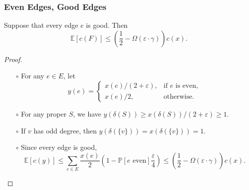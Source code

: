 \documentclass{beamer}
\newcommand{\EE}{\mathbb{E}}
\newcommand{\PP}{\mathbb{P}}
\begin{document}
  \begin{frame}
    \frametitle{Even Edges, Good Edges}
  
    \begin{lemma}
      Suppose that every edge $e$ is good. Then
      \vspace{-10pt}
      $$ \EE[c(F)] \leq \left(\frac{1}{2} - \Omega(\varepsilon \cdot \gamma)\right) c(x). $$
    \end{lemma}

    \pause

    \begin{proof}
      \begin{itemize}
        \item[$\circ$] For any $e \in E$, let
        \vspace{-10pt}
        $$ y(e) = \left\{
          \begin{array}{ll}
            x(e)/(2 + \varepsilon), & \text{if $e$ is even}, \\
            x(e)/2, & \text{otherwise}.
          \end{array}
        \right. $$
        \vspace{-15pt}
        \pause
        \item[$\circ$] For any proper $S$, we have $y(\delta(S)) \geq x(\delta(S))/(2 + \varepsilon) \geq 1$. \pause
        \item[$\circ$] If $v$ has odd degree, then $y(\delta(\{ v \})) = x(\delta(\{ v \})) = 1$. \pause
        \item[$\circ$] Since every edge is good,
        \vspace{-10pt}
        $$ \EE[c(y)] \leq \sum_{e \in E} \frac{x(e)}{2} \left(1 - \PP[\text{$e$ even}] \frac{\varepsilon}{4}\right) \leq \left(\frac{1}{2} - \Omega(\varepsilon \cdot \gamma)\right) c(x). $$
        \vspace{-20pt}
      \end{itemize}
    \end{proof}
  
  \end{frame}
\end{document}
